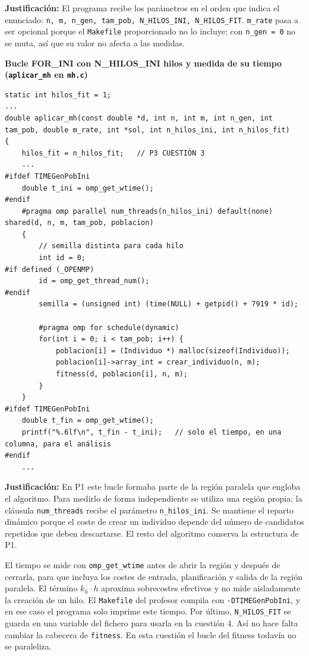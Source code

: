 \documentclass[12pt]{article}
\begin{document}
\begin{enumerate}
\textbf{Justificación:} El programa recibe los parámetros en el orden que indica el enunciado: \texttt{n, m, n\_gen, tam\_pob, N\_HILOS\_INI, N\_HILOS\_FIT}. \texttt{m\_rate} pasa a ser opcional porque el \texttt{Makefile} proporcionado no lo incluye; con \texttt{n\_gen = 0} no se muta, así que su valor no afecta a las medidas.

\vspace{0.5cm}


\medskip
\noindent\textbf{Bucle FOR\_INI con N\_HILOS\_INI hilos y medida de su tiempo (\texttt{aplicar\_mh} en \texttt{mh.c})}\par
\smallskip

\begin{lstlisting}[style=EstiloC]
static int hilos_fit = 1;
...
double aplicar_mh(const double *d, int n, int m, int n_gen, int tam_pob, double m_rate, int *sol, int n_hilos_ini, int n_hilos_fit)
{
    hilos_fit = n_hilos_fit;   // P3 CUESTIÓN 3
    ...
#ifdef TIMEGenPobIni
    double t_ini = omp_get_wtime();
#endif
    #pragma omp parallel num_threads(n_hilos_ini) default(none) shared(d, n, m, tam_pob, poblacion)
    {
        // semilla distinta para cada hilo
        int id = 0;
#if defined (_OPENMP)
        id = omp_get_thread_num();
#endif
        semilla = (unsigned int) (time(NULL) + getpid() + 7919 * id);

        #pragma omp for schedule(dynamic)
        for(int i = 0; i < tam_pob; i++) {
            poblacion[i] = (Individuo *) malloc(sizeof(Individuo));
            poblacion[i]->array_int = crear_individuo(n, m);
            fitness(d, poblacion[i], n, m);
        }
    }
#ifdef TIMEGenPobIni
    double t_fin = omp_get_wtime();
    printf("%.6lf\n", t_fin - t_ini);   // solo el tiempo, en una columna, para el análisis
#endif
    ...
\end{lstlisting}

\textbf{Justificación:} En P1 este bucle formaba parte de la región paralela que engloba el algoritmo. Para medirlo de forma independiente se utiliza una región propia; la cláusula \texttt{num\_threads} recibe el parámetro \texttt{n\_hilos\_ini}. Se mantiene el reparto dinámico porque el coste de crear un individuo depende del número de candidatos repetidos que deben descartarse. El resto del algoritmo conserva la estructura de P1.

El tiempo se mide con \texttt{omp\_get\_wtime} antes de abrir la región y después de cerrarla, para que incluya los costes de entrada, planificación y salida de la región paralela. El término $k_h \cdot h$ aproxima sobrecostes efectivos y no mide aisladamente la creación de un hilo. El \texttt{Makefile} del profesor compila con \texttt{-DTIMEGenPobIni}, y en ese caso el programa solo imprime este tiempo. Por último, \texttt{N\_HILOS\_FIT} se guarda en una variable del fichero para usarla en la cuestión 4. Así no hace falta cambiar la cabecera de \texttt{fitness}. En esta cuestión el bucle del fitness todavía no se paraleliza.


\end{enumerate}
\end{document}
